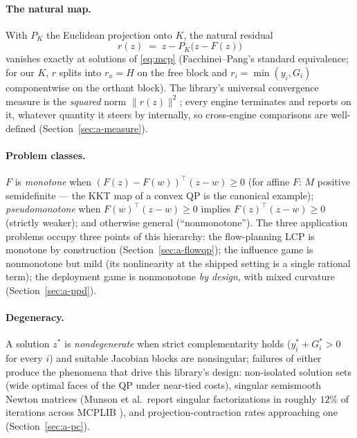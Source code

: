 \paragraph{The natural map.} With $P_K$ the Euclidean projection onto $K$,
the natural residual
\begin{equation}
  r(z) \;=\; z - P_K\bigl(z - F(z)\bigr)
  \label{eq:natres}
\end{equation}
vanishes exactly at solutions of \eqref{eq:mcp} (Facchinei--Pang's standard
equivalence; for our $K$, $r$ splits into $r_x = H$ on the free block and
$r_i = \min(y_i, G_i)$ componentwise on the orthant block). The library's
universal convergence measure is the \emph{squared} norm $\|r(z)\|^2$;
every engine terminates and reports on it, whatever quantity it steers by
internally, so cross-engine comparisons are well-defined
(Section~\ref{sec:a-measure}).

\paragraph{Problem classes.} $F$ is \emph{monotone} when
$(F(z) - F(w))^\top (z - w) \ge 0$ (for affine $F$: $M$ positive
semidefinite --- the KKT map of a convex QP is the canonical example);
\emph{pseudomonotone} when $F(w)^\top(z - w) \ge 0$ implies
$F(z)^\top(z - w) \ge 0$ (strictly weaker); and otherwise general
(``nonmonotone''). The three application problems occupy three points of
this hierarchy: the flow-planning LCP is monotone by construction
(Section~\ref{sec:a-flowqp}); the influence game is nonmonotone but mild
(its nonlinearity at the shipped setting is a single rational term); the
deployment game is nonmonotone \emph{by design}, with mixed curvature
(Section~\ref{sec:a-ppd}).

\paragraph{Degeneracy.} A solution $z^\ast$ is \emph{nondegenerate} when
strict complementarity holds ($y_i^\ast + G_i^\ast > 0$ for every $i$) and
suitable Jacobian blocks are nonsingular; failures of either produce the
phenomena that drive this library's design: non-isolated solution sets
(wide optimal faces of the QP under near-tied costs), singular semismooth
Newton matrices (Munson et al.\ report singular factorizations in roughly
$12\%$ of iterations across MCPLIB \cite{munson2001}), and
projection-contraction rates approaching one
(Section~\ref{sec:a-pc}).

